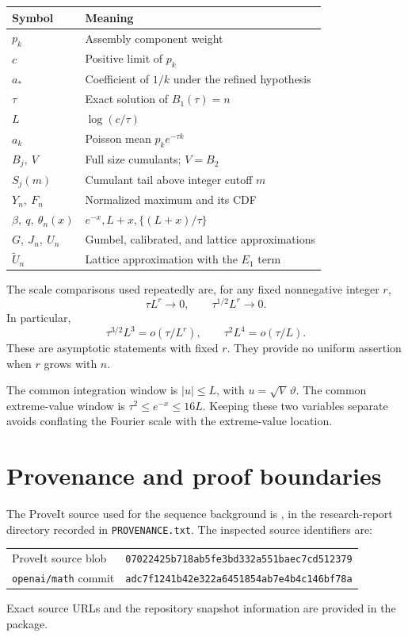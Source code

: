 \documentclass[11pt,letterpaper]{article}
\numberwithin{equation}{section}
\theoremstyle{remark}\newtheorem{remark}[theorem]{Remark}
\theoremstyle{definition}\newtheorem{definition}[theorem]{Definition}\theoremstyle{plain}
\begin{document}
\begin{center}
\begin{tabular}{ll}
\toprule
Symbol & Meaning\\
\midrule
\(p_k\) & Assembly component weight\\
\(c\) & Positive limit of \(p_k\)\\
\(a_*\) & Coefficient of \(1/k\) under the refined hypothesis\\
\(\tau\) & Exact solution of \(B_1(\tau)=n\)\\
\(L\) & \(\log(c/\tau)\)\\
\(a_k\) & Poisson mean \(p_ke^{-\tau k}\)\\
\(B_j,\ V\) & Full size cumulants; \(V=B_2\)\\
\(S_j(m)\) & Cumulant tail above integer cutoff \(m\)\\
\(Y_n,\ F_n\) & Normalized maximum and its CDF\\
\(\beta,\ q,\ \theta_n(x)\) & \(e^{-x},L+x,\{(L+x)/\tau\}\)\\
\(G,\ J_n,\ U_n\) & Gumbel, calibrated, and lattice approximations\\
\(\widetilde U_n\) & Lattice approximation with the \(E_1\) term\\
\bottomrule
\end{tabular}
\end{center}

The scale comparisons used repeatedly are, for any fixed
nonnegative integer \(r\),
\[
 \tau L^r\longrightarrow0,\qquad
 \tau^{1/2}L^r\longrightarrow0.
\]
In particular,
\[
 \tau^{3/2}L^3=o(\tau/L^r),\qquad
 \tau^2L^4=o(\tau/L).
\]
These are asymptotic statements with fixed \(r\). They provide
no uniform assertion when \(r\) grows with \(n\).

The common integration window is
\(|u|\le L\), with \(u=\sqrt V\,\vartheta\).
The common extreme-value window is
\(\tau^2\le e^{-x}\le16L\).
Keeping these two variables separate avoids conflating the
Fourier scale with the extreme-value location.

\section{Provenance and proof boundaries}\label{ncy:gb:app:provenance}

The ProveIt source used for the sequence background is
, in the
research-report directory recorded in \texttt{PROVENANCE.txt}.
The inspected source identifiers are:
\begin{center}
\small
\begin{tabular}{ll}
ProveIt source blob & \texttt{07022425b718ab5fe3bd332a551baec7cd512379}\\
\texttt{openai/math} commit & \texttt{adc7f1241b42e322a6451854ab7e4b4c146bf78a}
\end{tabular}
\end{center}
Exact source URLs and the repository snapshot information are
provided in the package.
\end{document}
